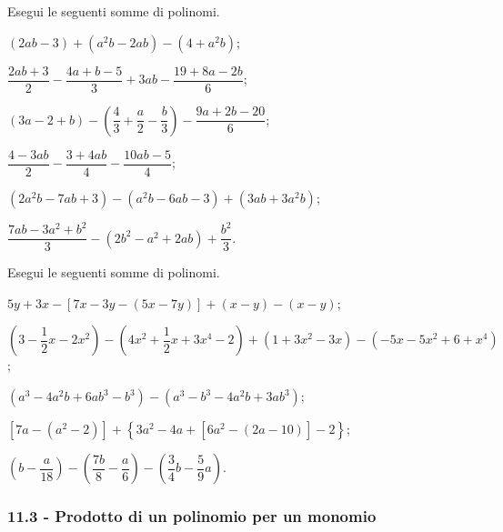 \begin{esercizio}[\Ast]
\label{ese:11.16} %
 Esegui le seguenti somme di polinomi.

 \begin{enumeratea}
 \item $(2ab-3)+\left(a^{2}b-2ab\right)-\left(4+a^{2}b\right)$;
 \item $\dfrac{2ab+3}{2}-\dfrac{4a+b-5}{3}+3ab-\dfrac{19+8a-2b}{6}$;
 \item $(3a-2+b)-\left(\dfrac{4}{3}+\dfrac{a}{2}-\dfrac{b}{3}\right)-\dfrac{9a+2b-20}{6}$;
 \item $\dfrac{4-3ab}{2}-\dfrac{3+4ab}{4}-\dfrac{10ab-5}{4}$;
 \item $\left(2a^{2}b-7ab+{3}\right)-\left(a^{2}b-6ab-3\right)+\left(3ab+3a^{2}b\right)$;
 \item $\dfrac{7ab-3a^{2}+b^{2}}{3}-\left(2b^{2}-a^{2}+2ab\right)+\dfrac{b^{2}}{3}$.
\end{enumeratea}
\end{esercizio}

\begin{esercizio}[\Ast]
\label{ese:11.17} %
 Esegui le seguenti somme di polinomi.

 \begin{enumeratea}
 \item $5y+3x-[7x-3y-(5x-7y)]+(x-y)-(x-y)$;
 \item $\left(3-\dfrac{1}{2}x-2x^{2}\right)-\left(4x^{2}+\dfrac{1}{2}x+3x^{4}-2\right)+\left(1+3x^{2}-3x\right)-\left(-5x-5x^{2}+6+x^{4}\right)$;
 \item $\left(a^{3}-4a^{2}b+6ab^{3}-b^{3}\right)-\left(a^{3}-b^{3}-4a^{2}b+3ab^{3}\right)$;
 \item $\left[7a-\left(a^{2}-2\right)\right]+\left\lbrace 3a^{2}-4a+\left[6a^{2}-(2a-10)\right]-2 \right\rbrace$;
 \item $\left(b-\dfrac{a}{18}\right)-\left(\dfrac{7b}{8}-\dfrac{a}{6}\right)-\left(\dfrac{3}{4}b-\dfrac{5}{9}a\right)$.
\end{enumeratea}
\end{esercizio}

\subsubsection*{11.3 - Prodotto di un polinomio per un monomio}

